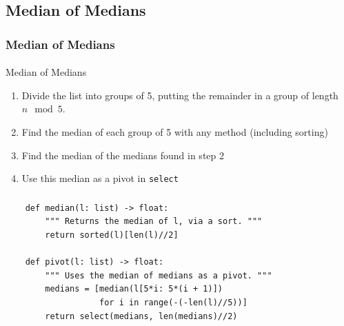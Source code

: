 \documentclass{beamer}                             %
\begin{document}
\subsection{Median of Medians}

\begin{frame}
\frametitle{Median of Medians}
\framesubtitle{}
\begin{block}{Median of Medians}
  \begin{enumerate}
    \item Divide the list into groups of 5,
      putting the remainder in a group of length \( n \mod 5 \).
    \item Find the median of each group of 5 with any method (including sorting)
    \item Find the median of the medians found in step 2
    \item Use this median as a pivot in \texttt{select}
  \end{enumerate}
\end{block}
\end{frame}

\begin{frame}[fragile]
\frametitle{}
\framesubtitle{}
\begin{algorithm}[H]
  \caption{Median of medians}
  \begin{verbatim}
    def median(l: list) -> float:
        """ Returns the median of l, via a sort. """
        return sorted(l)[len(l)//2]

    def pivot(l: list) -> float:
        """ Uses the median of medians as a pivot. """
        medians = [median(l[5*i: 5*(i + 1)])
                   for i in range(-(-len(l)//5))]
        return select(medians, len(medians)//2)
  \end{verbatim}
\end{algorithm}
\end{frame}
\end{document}

